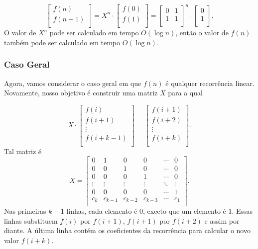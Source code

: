 \[
 \begin{bmatrix}
  f(n) \\
  f(n+1) \\
 \end{bmatrix}
=
X^n \cdot
 \begin{bmatrix}
  f(0) \\
  f(1) \\
 \end{bmatrix}
=
 \begin{bmatrix}
  0 & 1 \\
  1 & 1 \\
 \end{bmatrix}^n
\cdot
 \begin{bmatrix}
  0 \\
  1 \\
 \end{bmatrix}.
\]
O valor de $X^n$ pode ser calculado em
tempo $O(\log n)$,
então o valor de $f(n)$ também pode ser calculado
em tempo $O(\log n)$.

\subsubsection{Caso Geral}

Agora, vamos considerar o caso geral em que
$f(n)$ é qualquer recorrência linear.
Novamente, nosso objetivo é construir uma matriz $X$
para a qual

\[ X \cdot
 \begin{bmatrix}
  f(i) \\
  f(i+1) \\
  \vdots \\
  f(i+k-1) \\
 \end{bmatrix}
=
 \begin{bmatrix}
  f(i+1) \\
  f(i+2) \\
  \vdots \\
  f(i+k) \\
 \end{bmatrix}.
\]
Tal matriz é
\[
X =
 \begin{bmatrix}
  0 & 1 & 0 & 0 & \cdots & 0 \\
  0 & 0 & 1 & 0 & \cdots & 0 \\
  0 & 0 & 0 & 1 & \cdots & 0 \\
  \vdots & \vdots & \vdots & \vdots & \ddots & \vdots \\
  0 & 0 & 0 & 0 & \cdots & 1 \\
  c_k & c_{k-1} & c_{k-2} & c_{k-3} & \cdots & c_1 \\
 \end{bmatrix}.
\]
Nas primeiras $k-1$ linhas, cada elemento é 0,
exceto que um elemento é 1.
Essas linhas substituem $f(i)$ por $f(i+1)$,
$f(i+1)$ por $f(i+2)$ e assim por diante.
A última linha contém os coeficientes da recorrência
para calcular o novo valor $f(i+k)$.


